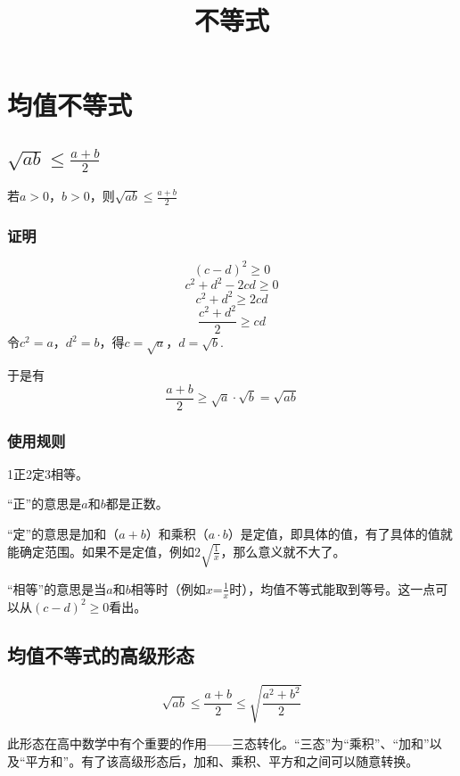 \documentclass[a4paper,10pt]{ctexbook}
\title{不等式}
\begin{document}
\maketitle
\tableofcontents

\newpage

\chapter{均值不等式}

\section{$\sqrt{ab} \leqslant \frac{a+b}{2}$}

若$ a > 0 $，$ b > 0 $，则$ \sqrt{ab} \le \frac{a+b}{2} $

\subsection{证明}

\[ (c-d)^2 \ge 0 \]
\[ c^2 + d^2 - 2cd \ge 0 \]
\[ c^2 + d^2 \ge 2cd \]
\[ \frac{c^2 + d^2}{2} \ge cd \]
令$ c^2 = a $，$ d^2 = b $，得$ c = \sqrt{a}$，$ d = \sqrt{b} $.

于是有
\[ \frac{a+b}{2} \ge \sqrt{a} \cdot \sqrt{b} = \sqrt{ab} \]

\subsection{使用规则}

1正2定3相等。

“正”的意思是$a$和$b$都是正数。

“定”的意思是加和（$a + b$）和乘积（$a \cdot b$）是定值，即具体的值，有了具体的值就能确定范围。如果不是定值，例如$ 2 \sqrt{\frac{1}{x}} $，那么意义就不大了。

“相等”的意思是当$a$和$b$相等时（例如$x$=$\frac{1}{x}$时），均值不等式能取到等号。这一点可以从$ (c-d)^2 \ge 0 $看出。

\section{均值不等式的高级形态}

\[ \sqrt{ab} \le \frac{a+b}{2} \le \sqrt{ \frac{a^2 + b^2}{2} }\]

此形态在高中数学中有个重要的作用——三态转化。“三态”为“乘积”、“加和”以及“平方和”。有了该高级形态后，加和、乘积、平方和之间可以随意转换。
\end{document}
